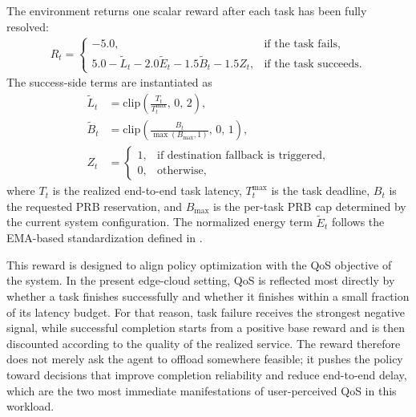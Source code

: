 The environment returns one scalar reward after each task has been fully resolved:
\begin{align}
R_t =
\begin{cases}
-5.0, & \text{if the task fails}, \\
5.0 - \widetilde{L}_t - 2.0\widetilde{E}_t - 1.5\widetilde{B}_t - 1.5 Z_t, & \text{if the task succeeds}.
\end{cases}
\label{eq:reward}
\end{align}
The success-side terms are instantiated as
\begin{align}
\widetilde{L}_t &= \mathrm{clip}\!\left(\frac{T_t}{T_t^{\max}},\, 0,\, 2\right), \\
\widetilde{B}_t &= \mathrm{clip}\!\left(\frac{B_t}{\max(B_{\max}, 1)},\, 0,\, 1\right), \\
Z_t &=
\begin{cases}
1, & \text{if destination fallback is triggered}, \\
0, & \text{otherwise},
\end{cases}
\end{align}
where \(T_t\) is the realized end-to-end task latency, \(T_t^{\max}\) is the task deadline, \(B_t\) is the requested PRB reservation, and \(B_{\max}\) is the per-task PRB cap determined by the current system configuration. The normalized energy term \(\widetilde{E}_t\) follows the EMA-based standardization defined in .

This reward is designed to align policy optimization with the QoS objective of the system. In the present edge-cloud setting, QoS is reflected most directly by whether a task finishes successfully and whether it finishes within a small fraction of its latency budget. For that reason, task failure receives the strongest negative signal, while successful completion starts from a positive base reward and is then discounted according to the quality of the realized service. The reward therefore does not merely ask the agent to offload somewhere feasible; it pushes the policy toward decisions that improve completion reliability and reduce end-to-end delay, which are the two most immediate manifestations of user-perceived QoS in this workload.

